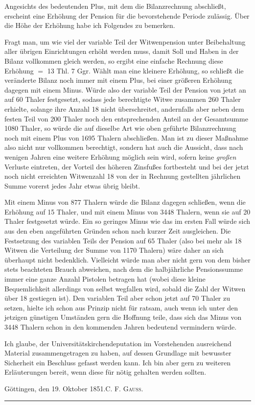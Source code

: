 Angesichts des bedeutenden Plus, mit dem die Bilanzrechnung abschließt, erscheint eine Erhöhung der Pension für die bevorstehende Periode zulässig. Über die Höhe der Erhöhung habe ich Folgendes zu bemerken.

Fragt man, um wie viel der variable Teil der Witwenpension unter Beibehaltung aller übrigen Einrichtungen erhöht werden muss, damit Soll und Haben in der Bilanz vollkommen gleich werden, so ergibt eine einfache Rechnung diese Erhöhung \(=\) 13 Thl. 7 Ggr. Wählt man eine kleinere Erhöhung, so schließt die veränderte Bilanz noch immer mit einem Plus, bei einer größeren Erhöhung dagegen mit einem Minus. Würde also der variable Teil der Pension von jetzt an auf 60 Thaler festgesetzt, sodass jede berechtigte Witwe zusammen 260 Thaler erhielte, solange ihre Anzahl 18 nicht überschreitet, andernfalls aber neben dem festen Teil von 200 Thaler noch den entsprechenden Anteil an der Gesamtsumme 1080 Thaler, so würde die auf dieselbe Art wie oben geführte Bilanzrechnung noch mit einem Plus von 1695 Thalern abschließen. Man ist zu dieser Maßnahme also nicht nur vollkommen berechtigt, sondern hat auch die Aussicht, dass nach wenigen Jahren eine weitere Erhöhung möglich sein wird, sofern keine \textit{großen} Verluste eintreten, der Vorteil des höheren Zinsfußes fortbesteht und bei der jetzt noch nicht erreichten Witwenzahl 18 von der in Rechnung gestellten jährlichen Summe vorerst jedes Jahr etwas übrig bleibt.

Mit einem Minus von 877 Thalern würde die Bilanz dagegen schließen, wenn die Erhöhung auf 15 Thaler, und mit einem Minus von 3448 Thalern, wenn sie auf 20 Thaler festgesetzt würde. Ein so geringes Minus wie das im ersten Fall würde sich aus den eben angeführten Gründen schon nach kurzer Zeit ausgleichen. Die Festsetzung des variablen Teils der Pension auf 65 Thaler (also bei mehr als 18 Witwen die Verteilung der Summe von 1170 Thalern) wäre daher an sich überhaupt nicht bedenklich. Vielleicht würde man aber nicht gern von dem bisher stets beachteten Brauch abweichen, nach dem die halbjährliche Pensionssumme immer eine ganze Anzahl Pistolen betragen hat (wobei diese kleine Bequemlichkeit allerdings von selbst wegfallen wird, sobald die Zahl der Witwen über 18 gestiegen ist). Den variablen Teil aber schon jetzt auf 70 Thaler zu setzen, hielte ich schon aus Prinzip nicht für ratsam, auch wenn ich unter den jetzigen günstigen Umständen gern die Hoffnung teile, dass sich das Minus von 3448 Thalern schon in den kommenden Jahren bedeutend vermindern würde.

\medskip
Ich glaube, der Universitätskirchendeputation im Vorstehenden ausreichend Material zusammengetragen zu haben, auf dessen Grundlage mit bewusster Sicherheit ein Beschluss gefasst werden kann. Ich bin aber gern zu weiteren Erläuterungen bereit, wenn diese für nötig gehalten werden sollten.

Göttingen, den 19. Oktober 1851.\hfill C. F. \textsc{Gauss}.
\begin{center}\rule{.28\linewidth}{.3pt}\end{center}
